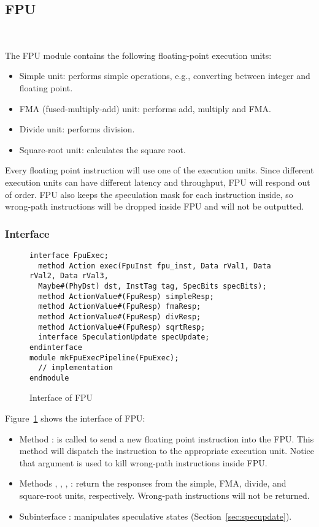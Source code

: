 \subsection{FPU}~\label{sec:fpu}

The FPU module contains the following floating-point execution units:
\begin{itemize}
    \item Simple unit: performs simple operations, e.g., converting between integer and floating point.
    \item FMA (fused-multiply-add) unit: performs add, multiply and FMA.
    \item Divide unit: performs division.
    \item Square-root unit: calculates the square root.
\end{itemize}
Every floating point instruction will use one of the execution units.
Since different execution units can have different latency and throughput, FPU will respond out of order.
FPU also keeps the speculation mask for each instruction inside, so wrong-path instructions will be dropped inside FPU and will not be outputted.

\subsubsection{Interface}

\begin{figure}
\begin{lstlisting}[caption={}]
interface FpuExec;
  method Action exec(FpuInst fpu_inst, Data rVal1, Data rVal2, Data rVal3,
  Maybe#(PhyDst) dst, InstTag tag, SpecBits specBits);
  method ActionValue#(FpuResp) simpleResp;
  method ActionValue#(FpuResp) fmaResp;
  method ActionValue#(FpuResp) divResp;
  method ActionValue#(FpuResp) sqrtResp;
  interface SpeculationUpdate specUpdate;
endinterface
module mkFpuExecPipeline(FpuExec);
  // implementation
endmodule
\end{lstlisting}
\caption{Interface of FPU}\label{fig:fpu-ifc}
\end{figure}

Figure~\ref{fig:fpu-ifc} shows the interface of FPU:
\begin{itemize}
    \item Method : is called to send a new floating point instruction  into the FPU.
    This method will dispatch the instruction to the appropriate execution unit.
    Notice that argument  is used to kill wrong-path instructions inside FPU.
    \item Methods , , , : return the responses from the simple, FMA, divide, and square-root units, respectively.
    Wrong-path instructions will not be returned.
    \item Subinterface : manipulates speculative states (Section~\ref{sec:specupdate}).
\end{itemize}

